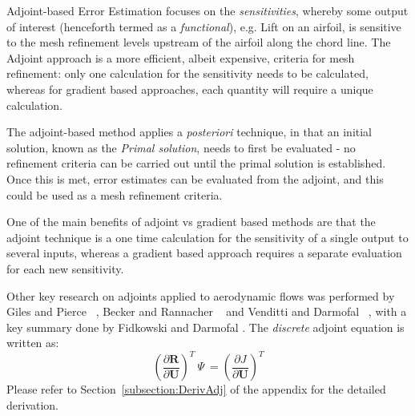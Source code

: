 Adjoint-based Error Estimation focuses on the \textit{sensitivities}, whereby some output of interest (henceforth termed as a \textit{functional}), e.g. Lift on an airfoil, is sensitive to the mesh refinement levels upstream of the airfoil along the chord line. The Adjoint approach is a more efficient, albeit expensive, criteria for mesh refinement: only one calculation for the sensitivity needs to be calculated, whereas for gradient based approaches, each quantity will require a unique calculation.\par

The adjoint-based method applies a \textit{posteriori} technique, in that an initial solution, known as the \textit{Primal solution}, needs to first be evaluated - no refinement criteria can be carried out until the primal solution is established. Once this is met, error estimates can be evaluated from the adjoint, and this could be used as a mesh refinement criteria. \par

One of the main benefits of adjoint vs gradient based methods are that the adjoint technique is a one time calculation for the sensitivity of a single output to several inputs, whereas a gradient based approach requires a separate evaluation for each new sensitivity. ~\cite{Giles:2000}

Other key research on adjoints applied to aerodynamic flows was performed by Giles and Pierce ~\cite{Giles:2000}, Becker and Rannacher ~\cite{Becker:2001} and Venditti and Darmofal ~\cite{Venditti:2003}, with a key summary done by Fidkowski and Darmofal \cite{Fidkowski:2011}. The \textit{discrete} adjoint equation is written as:
\begin{equation}
\left( \frac{\partial \textbf{R}}{\partial \textbf{U}} \right)^T ~\Psi~ = \left(\frac{\partial J}{\partial \textbf{U}}\right)^T
\end{equation}
Please refer to Section~\ref{subsection:DerivAdj} of the appendix for the detailed derivation.\par

